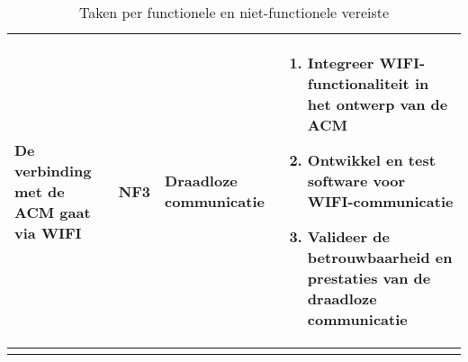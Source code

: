 \begin{longtable}{@{}p{4cm}p{2cm}p{3cm}p{5cm}@{}}
    De verbinding met de ACM gaat via WIFI                                                                 & NF3          & Draadloze communicatie        &
    \begin{enumerate}[nosep, leftmargin=*]
        \item Integreer WIFI-functionaliteit in het ontwerp van de ACM
        \item Ontwikkel en test software voor WIFI-communicatie
        \item Valideer de betrouwbaarheid en prestaties van de draadloze communicatie \
    \end{enumerate}                                                                                \\

    \bottomrule
    \caption{Taken per functionele en niet-functionele vereiste}
    \label{tab:taken_per_vereiste1}
\end{longtable}


